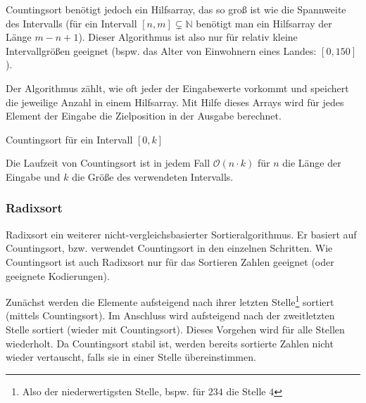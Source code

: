 Countingsort benötigt jedoch ein Hilfsarray, das so groß ist wie die Spannweite des Intervalls (für ein Intervall $[n,m] \subsetneq \mathbb{N}$ benötigt man ein Hilfsarray der Länge $m - n + 1$). Dieser Algorithmus ist also nur für relativ kleine Intervallgrößen geeignet (bspw. das Alter von Einwohnern eines Landes: $[0, 150]$).

Der Algorithmus zählt, wie oft jeder der Eingabewerte vorkommt und speichert die jeweilige Anzahl in einem Hilfsarray. Mit Hilfe dieses Arrays wird für jedes Element der Eingabe die Zielposition in der Ausgabe berechnet.

\begin{algorithm}
	\caption{Countingsort für ein Intervall $[0,k]$}
	\begin{algorithmic}
		\EndFor
		\EndFor
		 
		 
		\EndFor
		\EndProcedure
	\end{algorithmic}
\end{algorithm}

\begin{proposition}[Laufzeit]
	Die Laufzeit von Countingsort ist in jedem Fall $\mathcal{O}(n \cdot k)$ für $n$ die Länge der Eingabe und $k$ die Größe des verwendeten Intervalls.
\end{proposition}

\subsubsection{Radixsort}
Radixsort ein weiterer nicht-vergleichsbasierter Sortieralgorithmus. Er basiert auf Countingsort, bzw. verwendet Countingsort in den einzelnen Schritten. Wie Countingsort ist auch Radixsort nur für das Sortieren Zahlen geeignet (oder geeignete Kodierungen).

Zunächst werden die Elemente aufsteigend nach ihrer letzten Stelle\footnote{Also der niederwertigsten Stelle, bspw. für $234$ die Stelle $4$} sortiert (mittels Countingsort). Im Anschluss wird aufsteigend nach der zweitletzten Stelle sortiert (wieder mit Countingsort). Dieses Vorgehen wird für alle Stellen wiederholt. Da Countingsort stabil ist, werden bereits sortierte Zahlen nicht wieder vertauscht, falls sie in einer Stelle übereinstimmen.
